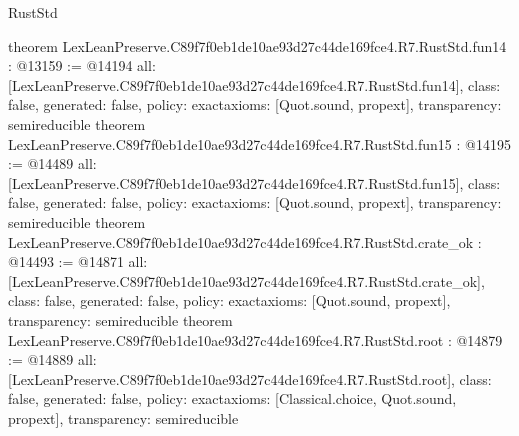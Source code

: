 \begin{lexlean}{RustStd}
\begin{coremodule}
{}
theorem LexLeanPreserve.C89f7f0eb1de10ae93d27c44de169fce4.R7.RustStd.fun14 : @13159 := @14194 {
  all: [LexLeanPreserve.C89f7f0eb1de10ae93d27c44de169fce4.R7.RustStd.fun14],
  class: false,
  generated: false,
  policy: exact{axioms: [Quot.sound, propext]},
  transparency: semireducible
}
theorem LexLeanPreserve.C89f7f0eb1de10ae93d27c44de169fce4.R7.RustStd.fun15 : @14195 := @14489 {
  all: [LexLeanPreserve.C89f7f0eb1de10ae93d27c44de169fce4.R7.RustStd.fun15],
  class: false,
  generated: false,
  policy: exact{axioms: [Quot.sound, propext]},
  transparency: semireducible
}
theorem LexLeanPreserve.C89f7f0eb1de10ae93d27c44de169fce4.R7.RustStd.crate_ok : @14493 := @14871 {
  all: [LexLeanPreserve.C89f7f0eb1de10ae93d27c44de169fce4.R7.RustStd.crate_ok],
  class: false,
  generated: false,
  policy: exact{axioms: [Quot.sound, propext]},
  transparency: semireducible
}
theorem LexLeanPreserve.C89f7f0eb1de10ae93d27c44de169fce4.R7.RustStd.root : @14879 := @14889 {
  all: [LexLeanPreserve.C89f7f0eb1de10ae93d27c44de169fce4.R7.RustStd.root],
  class: false,
  generated: false,
  policy: exact{axioms: [Classical.choice, Quot.sound, propext]},
  transparency: semireducible
}


\end{coremodule}
\end{lexlean}
